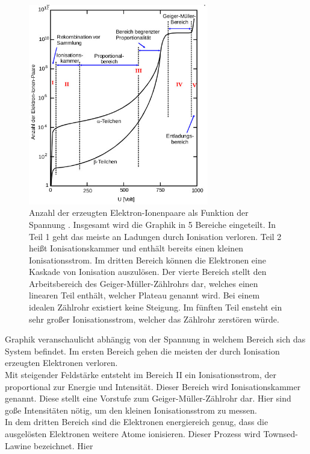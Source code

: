 \begin{figure}[H]
    \centering
    \includegraphics[width=0.7\textwidth]{images/bereich.jpg}
    \caption{Anzahl der erzeugten Elektron-Ionenpaare als Funktion der Spannung \cite{V703}.
    Insgesamt  wird die Graphik in 5 Bereiche eingeteilt. In Teil 1 geht das meiste an
    Ladungen durch Ionisation verloren. Teil 2 heißt Ionisationskammer und enthält bereits einen
    kleinen Ionisationsstrom. Im dritten Bereich können die Elektronen eine Kaskade
    von Ionisation auszulösen. Der vierte Bereich stellt den Arbeitsbereich des
    Geiger-Müller-Zählrohrs dar, welches einen linearen Teil enthält, welcher 
    Plateau genannt wird. Bei einem idealen Zählrohr existiert keine Steigung.
    Im fünften Teil ensteht ein sehr großer Ionisationsstrom, welcher das
    Zählrohr zerstören würde.
    }
    \label{fig:2}
\end{figure}
\justifying Graphik veranschaulicht abhängig von der Spannung in welchem Bereich sich das System befindet.
Im ersten Bereich gehen die meisten der durch Ionisation erzeugten Elektronen 
verloren. \\
Mit steigender Feldstärke entsteht im Bereich II ein Ionisationsstrom, der proportional zur Energie und Intensität.
Dieser Bereich wird Ionisationskammer genannt. Diese stellt eine Vorstufe zum Geiger-Müller-Zählrohr dar.
Hier sind goße Intensitäten nötig, um den kleinen Ionisationsstrom zu messen.\\
In dem dritten Bereich sind die Elektronen energiereich genug, dass die ausgelösten Elektronen
weitere Atome ionisieren. Dieser Prozess wird Townsed-Lawine bezeichnet. Hier
